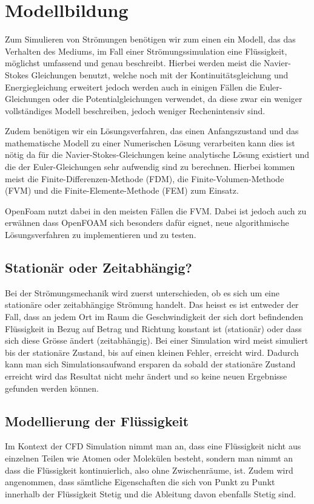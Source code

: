 %
%
%
%
\section{Modellbildung
\label{openfoam:section:teil1}}
Zum Simulieren von Strömungen benötigen wir zum einen ein Modell, das das Verhalten des Mediums, im Fall einer Strömungssimulation eine Flüssigkeit, möglichst umfassend und genau beschreibt. 
Hierbei werden meist die Navier-Stokes Gleichungen benutzt, welche noch mit der Kontinuitätsgleichung und Energiegleichung erweitert jedoch werden auch in einigen Fällen die Euler-Gleichungen oder die Potentialgleichungen verwendet, da diese zwar ein weniger vollständiges Modell beschreiben, jedoch weniger Rechenintensiv sind.

Zudem benötigen wir ein Lösungsverfahren, das einen Anfangszustand und das mathematische Modell zu einer Numerischen Lösung verarbeiten kann dies ist nötig da für die Navier-Stokes-Gleichungen keine analytische Lösung existiert und die der Euler-Gleichungen sehr aufwendig sind zu berechnen. 
Hierbei kommen meist die Finite-Differenzen-Methode (FDM), die Finite-Volumen-Methode (FVM) und die Finite-Elemente-Methode (FEM) zum Einsatz. 

OpenFoam nutzt dabei in den meisten Fällen die FVM. 
Dabei ist jedoch auch zu erwähnen dass OpenFOAM sich besonders dafür eignet, neue algorithmische Lösungsverfahren zu implementieren und zu testen.

\subsection{Stationär oder Zeitabhängig?}
Bei der Strömungsmechanik wird zuerst unterschieden, ob es sich um eine stationäre oder zeitabhängige Strömung handelt.
Das heisst es ist entweder der Fall, dass an jedem Ort im Raum die Geschwindigkeit der sich dort befindenden Flüssigkeit in Bezug auf Betrag und Richtung konstant ist (stationär) oder dass sich diese Grösse ändert (zeitabhängig).
Bei einer Simulation wird meist simuliert bis der stationäre Zustand, bis auf einen kleinen Fehler, erreicht wird.
Dadurch kann man sich Simulationsaufwand ersparen da sobald der stationäre Zustand erreicht wird das Resultat nicht mehr ändert und so keine neuen Ergebnisse gefunden werden können.

\subsection{Modellierung der Flüssigkeit}
Im Kontext der CFD Simulation nimmt man an, dass eine Flüssigkeit nicht aus einzelnen Teilen wie Atomen oder Molekülen besteht, sondern man nimmt an dass die Flüssigkeit kontinuierlich, also ohne Zwischenräume, ist. 
Zudem wird angenommen, dass sämtliche Eigenschaften die sich von Punkt zu Punkt innerhalb der Flüssigkeit Stetig und die Ableitung davon ebenfalls Stetig sind. 

